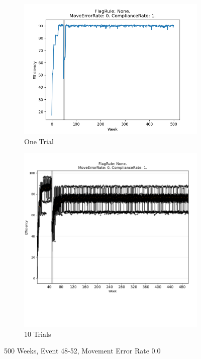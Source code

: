 \documentclass{article}%
\begin{document}
%


\begin{figure}[!htb]%
\begin{subfigure}[b]{0.45\linewidth}%
\includegraphics[width=\linewidth]{1000fr_None_er_0_cr_1_t1.png}%
\caption{One Trial}%
\end{subfigure}%
\begin{subfigure}[b]{0.45\linewidth}%
\includegraphics[clip,width=\linewidth,trim=0 4cm 0 0]{1000fr_None_er_0_cr_1_t10.png}%
\caption{10 Trials}%
\end{subfigure}%
\caption{500 Weeks, Event 48{-}52, Movement Error Rate 0.0}%
\end{figure}
\end{document}
